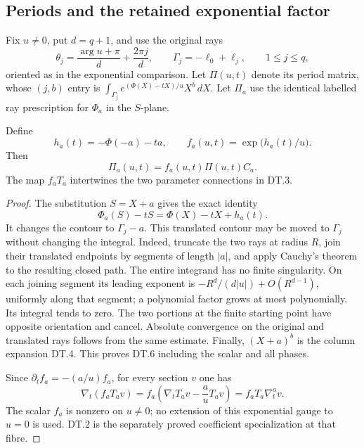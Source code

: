 \subsection{Periods and the retained exponential factor}
Fix \(u\ne0\), put \(d=q+1\), and use the original rays
\[
 \theta_j=\frac{\arg u+\pi}{d}+\frac{2\pi j}{d},\qquad
 \Gamma_j=-\ell_0+\ell_j,\qquad 1\le j\le q,
\]
oriented as in the exponential comparison. Let \(\Pi(u,t)\) denote its
period matrix, whose \((j,b)\) entry is
\(\int_{\Gamma_j}e^{(\Phi(X)-tX)/u}X^b\,dX\).
Let \(\Pi_a\) use the identical labelled ray prescription for \(\Phi_a\)
in the \(S\)-plane.

\begin{proposition}
Define
\begin{equation}\tag{DT.5}
 h_a(t)=-\Phi(-a)-ta,\qquad f_a(u,t)=\exp\bigl(h_a(t)/u\bigr).
\end{equation}
Then
\begin{equation}\tag{DT.6}
 \Pi_a(u,t)=f_a(u,t)\Pi(u,t)C_a.
\end{equation}
The map \(f_aT_a\) intertwines the two parameter connections in DT.3.
\end{proposition}
\begin{proof}
The substitution \(S=X+a\) gives the exact identity
\[
 \Phi_a(S)-tS=\Phi(X)-tX+h_a(t).
\]
It changes the contour to \(\Gamma_j-a\). This translated contour
may be moved to \(\Gamma_j\) without changing the integral. Indeed,
truncate the two rays at radius \(R\), join their translated endpoints
by segments of length \(|a|\), and apply Cauchy's theorem to the
resulting closed path. The entire integrand has no finite singularity.
On each joining segment its leading exponent is
\(-R^d/(d|u|)+O(R^{d-1})\), uniformly along that segment; a polynomial
factor grows at most polynomially. Its integral tends to zero.
The two portions at the finite starting point have opposite orientation
and cancel. Absolute convergence on the original and translated rays
follows from the same estimate. Finally, \((X+a)^b\) is the column
expansion DT.4. This proves DT.6 including the scalar and all phases.

Since \(\partial_tf_a=-(a/u)f_a\), for every section \(v\) one has
\[
 \nabla_t(f_aT_av)
  =f_a\left(\nabla_tT_av-\frac a uT_av\right)
  =f_aT_a\nabla_t^av.
\]
The scalar \(f_a\) is nonzero on \(u\ne0\); no extension of this
exponential gauge to \(u=0\) is used. DT.2 is the separately proved
coefficient specialization at that fibre.
\end{proof}

